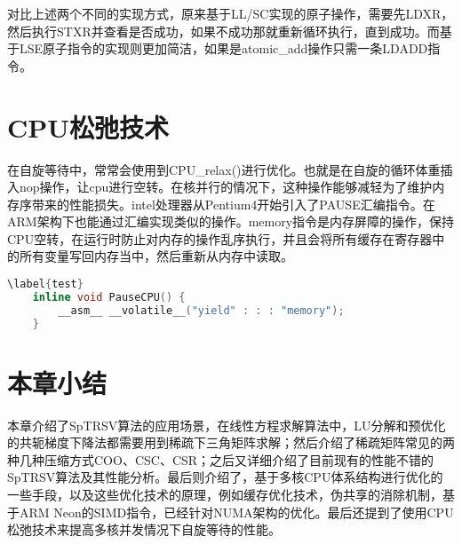 对比上述两个不同的实现方式，原来基于LL/SC实现的原子操作，需要先LDXR，然后执行STXR并查看是否成功，如果不成功那就重新循环执行，直到成功。而基于LSE原子指令的实现则更加简洁，如果是atomic\_add操作只需一条LDADD指令。

\section{CPU松弛技术}

在自旋等待中，常常会使用到CPU\_relax()进行优化。也就是在自旋的循环体重插入nop操作，让cpu进行空转。在核并行的情况下，这种操作能够减轻为了维护内存序带来的性能损失。intel处理器从Pentium4开始引入了PAUSE汇编指令。在ARM架构下也能通过汇编实现类似的操作。memory指令是内存屏障的操作，保持CPU空转，在运行时防止对内存的操作乱序执行，并且会将所有缓存在寄存器中的所有变量写回内存当中，然后重新从内存中读取。


\begin{lstlisting}[language=c++]
    \label{test}
    inline void PauseCPU() { 
        __asm__ __volatile__("yield" : : : "memory"); 
    }
\end{lstlisting}

\section{本章小结}

本章介绍了SpTRSV算法的应用场景，在线性方程求解算法中，LU分解和预优化的共轭梯度下降法都需要用到稀疏下三角矩阵求解；然后介绍了稀疏矩阵常见的两种几种压缩方式COO、CSC、CSR；之后又详细介绍了目前现有的性能不错的SpTRSV算法及其性能分析。最后则介绍了，基于多核CPU体系结构进行优化的一些手段，以及这些优化技术的原理，例如缓存优化技术，伪共享的消除机制，基于ARM Neon的SIMD指令，已经针对NUMA架构的优化。最后还提到了使用CPU松弛技术来提高多核并发情况下自旋等待的性能。




\endinput
